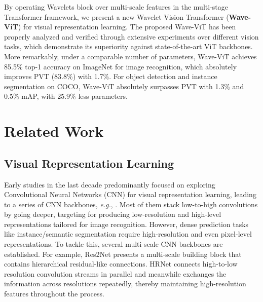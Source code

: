 \documentclass[runningheads]{llncs}
\begin{document}
By operating Wavelets block over multi-scale features in the multi-stage Transformer framework, we present a new Wavelet Vision Transformer (\textbf{Wave-ViT}) for visual representation learning.
The proposed Wave-ViT has been properly analyzed and verified through extensive experiments over different vision tasks, which demonstrate its superiority against state-of-the-art ViT backbones. More remarkably, under a comparable number of parameters, Wave-ViT achieves 85.5\% top-1 accuracy on ImageNet for image recognition, which absolutely improves PVT (83.8\%) with 1.7\%. For object detection and instance segmentation on COCO, Wave-ViT absolutely surpasses PVT with 1.3\% and 0.5\% mAP, with 25.9\% less parameters.


\section{Related Work}

\subsection{Visual Representation Learning}

Early studies in the last decade predominantly focused on exploring Convolutional Neural Networks (CNN) for visual representation learning, leading to a series of CNN backbones, \emph{e.g.}, \cite{he2016deep,krizhevsky2012imagenet,lecun1998gradient,simonyan2014very,szegedy2015going}. Most of them stack low-to-high convolutions by going deeper, targeting for producing low-resolution and high-level representations tailored for image recognition. However, dense prediction tasks like instance/semantic segmentation require high-resolution and even pixel-level representations. To tackle this, several multi-scale CNN backbones are established. For example, Res2Net \cite{gao2019res2net} presents a multi-scale building block that contains hierarchical residual-like connections. HRNet \cite{wang2020deep} connects high-to-low resolution convolution streams in parallel and meanwhile exchanges the information across resolutions repeatedly, thereby maintaining high-resolution features throughout the process.
\end{document}
